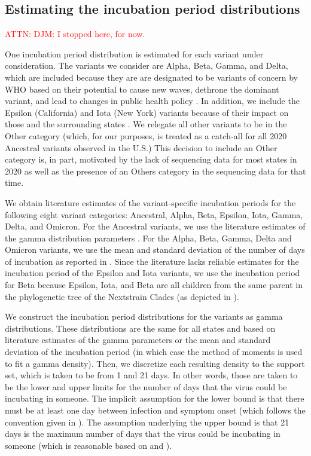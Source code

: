 \documentclass{article}
\newcommand{\attn }[1]{\textcolor{red}{ATTN: #1}}
\begin{document}
\subsection{Estimating the incubation period distributions} 

\attn{DJM: I stopped here, for now.}

One incubation period distribution is estimated for each variant under
consideration. The variants we consider are Alpha, Beta, Gamma, and Delta, which
are included because they are are designated to be variants of concern by WHO
based on their potential to cause new waves, dethrone the dominant variant, and
lead to changes in public health policy \citep{who2021tracking}. In addition, we
include the Epsilon (California) and Iota (New York) variants because of their
impact on those and the surrounding states \citep{yang2022investigation,
duerr2021dominance}. We relegate all other variants to be in the Other category
(which, for our purposes, is treated as a catch-all for all 2020 Ancestral
variants observed in the U.S.) This decision to include an Other category is, in
part, motivated by the lack of sequencing data for most states in 2020 as well
as the presence of an Others category in the sequencing data for that time. 

We obtain literature estimates of the variant-specific incubation periods for
the following eight variant categories: Ancestral, Alpha, Beta, Epsilon, Iota,
Gamma, Delta, and Omicron. For the Ancestral variants, we use the literature
estimates of the gamma distribution parameters \citep{tindale2020evidence}. For
the Alpha, Beta, Gamma, Delta and Omicron variants, we use the mean and standard
deviation of the number of days of incubation as reported in
\citet{tanaka2022shorter, grant2022impact, ogata2022shorter}.
Since the literature lacks reliable estimates for the incubation period of the
Epsilon and Iota variants, we use the incubation period for Beta because
Epsilon, Iota, and Beta are all children from the same parent in the
phylogenetic tree of the Nextstrain Clades (as depicted in
\citealp{hodcroft2021covariants}). 

We construct the incubation period distributions for the variants as gamma
distributions. These distributions are the same for all states and based on
literature estimates of the gamma parameters or the mean and standard deviation
of the incubation period (in which case the method of moments is used to fit a
gamma density). Then, we discretize each resulting density to the support set,
which is taken to be from 1 and 21 days. In other words, those are taken to be
the lower and upper limits for the number of days that the virus could be
incubating in someone. The implicit assumption for the lower bound is that there
must be at least one day between infection and symptom onset (which follows the
convention given in \citealp{phcan2021covid}). The assumption underlying the
upper bound is that 21 days is the maximum number of days that the virus could
be incubating in someone (which is reasonable based on
\citealp{zaki2021estimations} and \citealp{cortes2022sars}).
\end{document}
